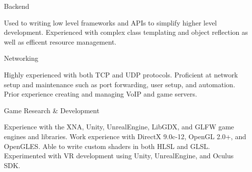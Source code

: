 \vspace{-5mm}

\begin{cventries}

  \cventry
    {}
    {Backend}
    {}
    {}
    {
      \vspace{-5mm}
      \begin{cvitems}
        \item {Used to writing low level frameworks and APIs to simplify higher level development. %
        Experienced with complex class templating and object reflection as well as %
        efficent resource management.}
      \end{cvitems}
    }
    \vspace{-1.8mm}
    \cventry
      {}
      {Networking}
      {}
      {}
      {
        \vspace{-5mm}
        \begin{cvitems}
          \item {Highly experienced with both TCP and UDP protocols. %
          Proficient at network setup and maintenance such as port forwarding, user %
          setup, and automation. Prior experience creating and managing VoIP and game servers.}
        \end{cvitems}
      }
      \vspace{-1.8mm}
      \cventry
        {}
        {Game Research \& Development}
        {}
        {}
        {
          \vspace{-5mm}
          \begin{cvitems}
            \item {Experience with the XNA, Unity, UnrealEngine, LibGDX, and GLFW game engines and %
            libraries. Work experience with DirectX 9.0c-12, OpenGL 2.0+, and OpenGLES. Able %
            to write custom shaders in both HLSL and GLSL. Experimented with VR development %
            using Unity, UnrealEngine, and Oculus SDK.}
          \end{cvitems}
        }

\end{cventries}
\vspace{-5mm}
